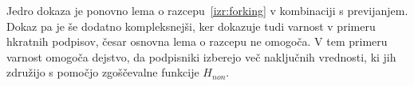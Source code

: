 Jedro dokaza je ponovno lema o razcepu~\ref{izr:forking} v kombinaciji s previjanjem. Dokaz pa je še
dodatno kompleksnejši, ker dokazuje tudi varnost v primeru hkratnih podpisov, česar osnovna lema
o razcepu ne omogoča. V tem primeru varnost omogoča dejstvo, da podpisniki izberejo več naključnih
vrednosti, ki jih združijo s pomočjo zgoščevalne funkcije $H_{non}$.
